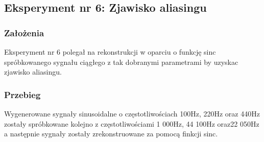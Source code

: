 \documentclass[12pt]{article}
\begin{document}
\newpage
\subsection{Eksperyment nr 6: Zjawisko aliasingu }
\subsubsection{Założenia}
Eksperyment nr 6 polegał na rekonstrukcji w oparciu o funkcję sinc spróbkowanego sygnału ciągłego z tak dobranymi parametrami by uzyskac zjawisko aliasingu.
\subsubsection{Przebieg}
Wygenerowane sygnały sinusoidalne o częstotliwościach 100Hz, 220Hz oraz 440Hz  zostały spróbkowane kolejno z częstotliwościami  1 000Hz, 44 100Hz oraz22 050Hz a następnie sygnały zostały zrekonstruowane za pomocą finkcji sinc.
\end{document}
